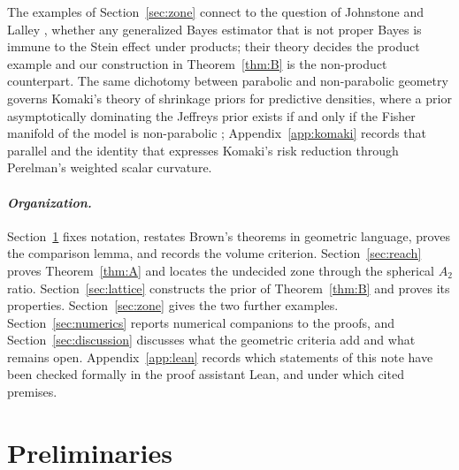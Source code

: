 \documentclass[11pt]{amsart}
\theoremstyle{plain}
\theoremstyle{definition}
\theoremstyle{remark}
\begin{document}
The examples of Section~\ref{sec:zone} connect to the question of Johnstone and
Lalley \cite{johnstonelalley1984}, whether any generalized Bayes estimator that
is not proper Bayes is immune to the Stein effect under products; their theory
decides the product example and our construction in Theorem~\ref{thm:B} is the
non-product counterpart. The same dichotomy between parabolic and non-parabolic
geometry governs Komaki's theory of shrinkage priors for predictive densities,
where a prior asymptotically dominating the Jeffreys prior exists if and only if
the Fisher manifold of the model is non-parabolic \cite{komaki2006};
Appendix~\ref{app:komaki} records that parallel and the identity that expresses
Komaki's risk reduction through Perelman's weighted scalar curvature.

\paragraph{\textit{Organization.}} Section~\ref{sec:prelim} fixes notation, restates
Brown's theorems in geometric language, proves the comparison lemma, and records
the volume criterion. Section~\ref{sec:reach} proves Theorem~\ref{thm:A} and
locates the undecided zone through the spherical $A_2$ ratio.
Section~\ref{sec:lattice} constructs the prior of Theorem~\ref{thm:B} and proves
its properties. Section~\ref{sec:zone} gives the two further examples.
Section~\ref{sec:numerics} reports numerical companions to the proofs, and
Section~\ref{sec:discussion} discusses what the geometric criteria add and what
remains open. Appendix~\ref{app:lean} records which statements of this note
have been checked formally in the proof assistant Lean, and under which
cited premises.

\section{Preliminaries}\label{sec:prelim}
\end{document}
